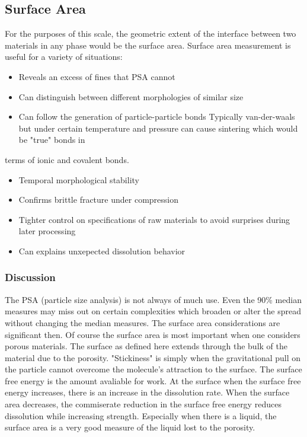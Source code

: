 \documentclass[12pt,a4paper,oneside,headinclude]{scrartcl}
\numberwithin{figure}{section}
\numberwithin{equation}{section}
\numberwithin{table}{section}
\begin{document}
\subsection{Surface Area}
\label{sec:org670977b}
For the purposes of this scale, the geometric extent of the interface between
two materials in any phase would be the surface area. Surface area measurement
is useful for a variety of situations:
\begin{itemize}
\item Reveals an excess of fines that PSA cannot
\item Can distinguish between different morphologies of similar size
\item Can follow the generation of particle-particle bonds
Typically van-der-waals but under certain temperature and pressure can cause sintering which would be "true" bonds in
\end{itemize}
terms of ionic and covalent bonds.
\begin{itemize}
\item Temporal morphological stability
\item Confirms brittle fracture under compression
\item Tighter control on specifications of raw materials to avoid surprises during
later processing
\item Can explains unxepected dissolution behavior
\end{itemize}
\subsubsection{Discussion}
\label{sec:orgbb06043}
The PSA (particle size analysis) is not always of much use. Even the 90\%
median measures may miss out on certain complexities which broaden or alter the
spread without changing the median measures. The surface area considerations are
significant then. Of course the surface area is most important when one
considers porous materials. The surface as defined here extends through the bulk
of the material due to the porosity.
"Stickiness" is simply when the gravitational pull on the particle cannot
overcome the molecule's attraction to the surface. The surface free energy is
the amount avaliable for work. At the surface when the surface free energy
increases, there is an increase in the dissolution rate. When the surface area
decreases, the commiserate reduction in the surface free energy reduces
dissolution while increasing strength. Especially when there is a liquid, the
surface area is a very good measure of the liquid lost to the porosity.
\end{document}
